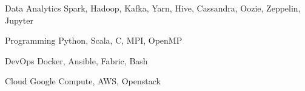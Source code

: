 


\begin{cvskills}


\cvskill
{Data Analytics} %
{Spark, Hadoop, Kafka, Yarn, Hive, Cassandra, Oozie, Zeppelin, Jupyter} %


\cvskill
{Programming} %
{Python, Scala, C, MPI, OpenMP} %


\cvskill
{DevOps} %
{Docker, Ansible, Fabric, Bash} %


\cvskill
{Cloud} %
{Google Compute, AWS, Openstack} %


\end{cvskills}